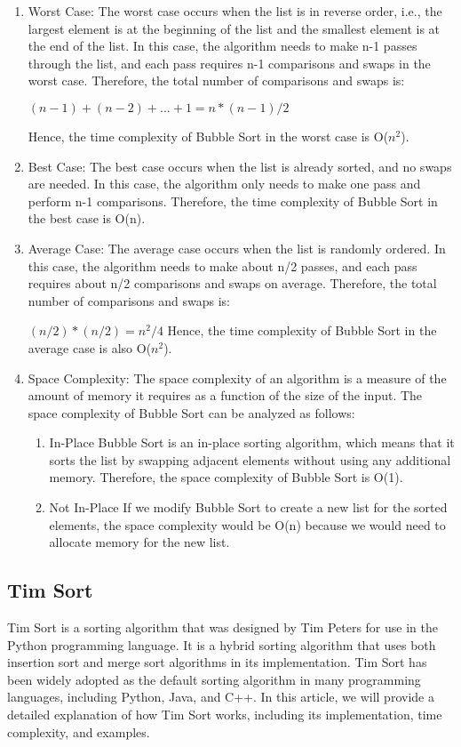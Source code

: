 \documentclass[a4paper, 11pt, oneside]{book} %
\begin{document}
\begin{enumerate}
  \item Worst Case:
  The worst case occurs when the list is in reverse order, i.e., the largest element is at the beginning of the list and the smallest element is at the end of the list. In this case, the algorithm needs to make n-1 passes through the list, and each pass requires n-1 comparisons and swaps in the worst case. Therefore, the total number of comparisons and swaps is:
  
        $(n-1) + (n-2) + ... + 1 = n*(n-1)/2$

  Hence, the time complexity of Bubble Sort in the worst case is O($n^2$).      
  \item Best Case:
  The best case occurs when the list is already sorted, and no swaps are needed. In this case, the algorithm only needs to make one pass and perform n-1 comparisons. Therefore, the time complexity of Bubble Sort in the best case is O(n).
  \item Average Case:
  The average case occurs when the list is randomly ordered. In this case, the algorithm needs to make about n/2 passes, and each pass requires about n/2 comparisons and swaps on average. Therefore, the total number of comparisons and swaps is:

  $(n/2)*(n/2) = n^2/4$
  Hence, the time complexity of Bubble Sort in the average case is also O($n^2$).
  \item Space Complexity:
    The space complexity of an algorithm is a measure of the amount of memory it requires as a function of the size of the input. The space complexity of Bubble Sort can be analyzed as follows:
    \begin{enumerate}
        \item In-Place
            Bubble Sort is an in-place sorting algorithm, which means that it sorts the list by swapping adjacent elements without using any additional memory. Therefore, the space complexity of Bubble Sort is O(1).
        \item Not In-Place
          If we modify Bubble Sort to create a new list for the sorted elements, the space complexity would be O(n) because we would need to allocate memory for the new list.
  
\end{enumerate}
\end{enumerate}

\subsection{Tim Sort}
Tim Sort is a sorting algorithm that was designed by Tim Peters for use in the Python programming language. It is a hybrid sorting algorithm that uses both insertion sort and merge sort algorithms in its implementation. Tim Sort has been widely adopted as the default sorting algorithm in many programming languages, including Python, Java, and C++. In this article, we will provide a detailed explanation of how Tim Sort works, including its implementation, time complexity, and examples.
\end{document}
